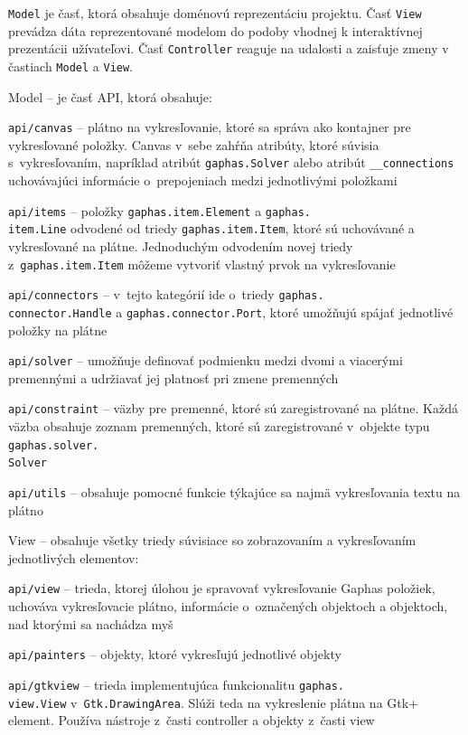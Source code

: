 \documentclass[11pt,oneside,final]{fithesis2}
\begin{document}
	\texttt{Model} je časť, ktorá obsahuje doménovú reprezentáciu projektu. Časť \texttt{View} prevádza dáta reprezentované modelom do podoby vhodnej k interaktívnej prezentácii užívateľovi. Časť \texttt{Controller} reaguje na udalosti a zaisťuje zmeny v častiach \texttt{Model} a \texttt{View}.~\cite{mvc}

\begin{list}{•}{}

\item Model -- je časť API, ktorá obsahuje:

    \begin{list}{•}{}
    	\item \texttt{api/canvas} -- plátno na vykresľovanie, ktoré sa správa ako kontajner pre vykresľované položky. Canvas v~sebe zahŕňa atribúty, ktoré súvisia s~vykresľovaním, napríklad atribút \texttt{gaphas.Solver} alebo atribút \texttt{\_\_connections} uchovávajúci informácie o~prepojeniach medzi jednotlivými položkami
    	\item \texttt{api/items} -- položky \texttt{gaphas.item.Element} a \texttt{gaphas.\\item.Line} odvodené od triedy \texttt{gaphas.item.Item}, ktoré sú uchovávané a vykresľované na plátne.
    	Jednoduchým odvodením novej triedy z~\texttt{gaphas.item.Item} môžeme vytvoriť vlastný prvok na vykresľovanie
    	\item \texttt{api/connectors} -- v~tejto kategórií ide o~triedy \texttt{gaphas.\\connector.Handle} a \texttt{gaphas.connector.Port}, ktoré umožňujú spájať jednotlivé položky na plátne
    	\item \texttt{api/solver} -- umožňuje definovať podmienku medzi dvomi a viacerými premennými a udržiavať jej platnosť pri zmene premenných
 		\item \texttt{api/constraint} -- väzby pre premenné, ktoré sú zaregistrované na plátne. Každá väzba obsahuje zoznam premenných, ktoré sú zaregistrované v~objekte typu \texttt{gaphas.solver.\\Solver}
 		\item \texttt{api/utils} -- obsahuje pomocné funkcie týkajúce sa najmä vykresľovania textu na plátno
    \end{list}


\item View -- obsahuje všetky triedy súvisiace so zobrazovaním a vykresľovaním jednotlivých elementov:
    \begin{list}{•}{}
    \item \texttt{api/view} -- trieda, ktorej úlohou je spravovať vykresľovanie Gaphas položiek, uchováva vykresľovacie plátno, informácie o~označených objektoch a objektoch, nad ktorými sa nachádza myš
    \item \texttt{api/painters} -- objekty, ktoré vykresľujú jednotlivé objekty
    \item \texttt{api/gtkview} -- trieda implementujúca funkcionalitu \texttt{gaphas.\\view.View} v~\texttt{Gtk.DrawingArea}. Slúži teda na vykreslenie plátna na Gtk+ element. Používa nástroje z~časti controller a objekty z~časti view
    \end{list}



\end{list}
\end{document}
